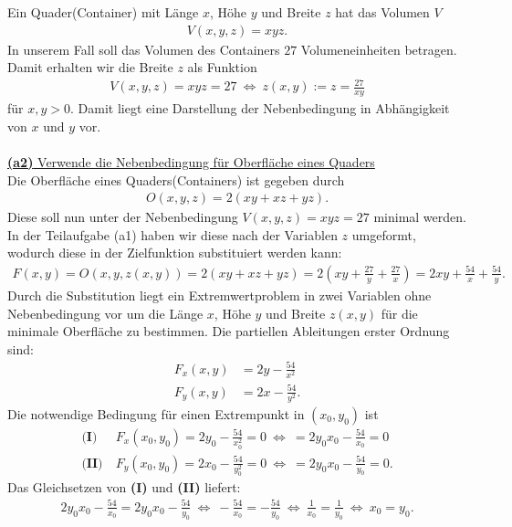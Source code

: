 Ein Quader(Container) mit Länge $ x $, Höhe $ y $ und Breite $ z $ hat das Volumen $ V $
\begin{align*}
	V(x,y,z) = xyz.
\end{align*}
In unserem Fall soll das Volumen des Containers $ 27 $ Volumeneinheiten betragen.
Damit erhalten wir die Breite $ z $ als Funktion
\begin{align*}
	V(x,y,z) = xyz = 27  
	\ \Leftrightarrow \
	z(x,y) := z = \frac{27}{xy}
\end{align*}
für $ x,y > 0 $. Damit liegt eine Darstellung der Nebenbedingung in Abhängigkeit von $x$ und $y$ vor.\\
\\
\underline{\textbf{(a2)} Verwende die Nebenbedingung für Oberfläche eines Quaders}\\
Die Oberfläche eines Quaders(Containers) ist gegeben durch
\begin{align*}
	O(x,y,z) = 2 (xy + xz + yz).
\end{align*}
Diese soll nun unter der Nebenbedingung $V(x,y,z) = xyz = 27$ minimal werden. In der Teilaufgabe (a1) haben wir diese nach der Variablen $z$ umgeformt, wodurch diese in der Zielfunktion substituiert werden kann:
\begin{align*}
	F(x,y) = O(x,y,z(x,y))
	=
	2 ( xy +xz +yz )= 2 \left( xy + \frac{27}{y} + \frac{27}{x}\right)
	=
	2xy + \frac{54}{x} + \frac{54}{y}.
\end{align*}
Durch die Substitution liegt ein Extremwertproblem in zwei Variablen ohne Nebenbedingung vor um die Länge $x$, Höhe $y$ und Breite $z(x,y)$ für die minimale Oberfläche zu bestimmen.
Die partiellen Ableitungen erster Ordnung sind:
\begin{align*}
	F_x(x,y) &= 2 y - \frac{54}{x^2}\\
	F_y(x,y) &= 2 x - \frac{54}{y^2}.
\end{align*}
Die notwendige Bedingung für einen Extrempunkt in $(x_0,y_0)$ ist
\begin{align*}
	\textbf{(I)} &\ F_x(x_0,y_0) = 2 y_0 - \frac{54}{x_0^2} = 0
	\ \Leftrightarrow \
	= 2 y_0 x_0- \frac{54}{x_0} = 0\\
	\textbf{(II)} &\ F_y(x_0,y_0) = 2 x_0 - \frac{54}{y_0^2} = 0
	\ \Leftrightarrow \
	= 2 y_0 x_0- \frac{54}{y_0} = 0.
\end{align*}
Das Gleichsetzen von \textbf{(I)} und \textbf{(II)} liefert:
\begin{align*}
	2 y_0 x_0- \frac{54}{x_0} = 2 y_0 x_0- \frac{54}{y_0}
	\ \Leftrightarrow \
	 -\frac{54}{x_0} = -\frac{54}{y_0}
	 \ \Leftrightarrow \
	 \frac{1}{x_0} = \frac{1}{y_0}
	 \ \Leftrightarrow \
	 x_0 = y_0.
\end{align*}
